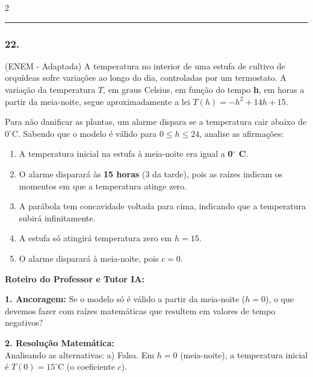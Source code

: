 \begin{multicols*}{2}
\par\vspace{\espacoQuestao}

\noindent\textcolor{CorLinha}{\rule{\linewidth}{0.5pt}} 
\par\vspace{\espacoPreQuestao}
\subsubsection*{22.} 
\begin{enunciadoLiteral}
(ENEM - Adaptada) A temperatura no interior de uma estufa de cultivo de orquídeas sofre variações ao longo do dia, controladas por um termostato. A variação da temperatura $T$, em graus Celsius, em função do tempo \textbf{h}, em horas a partir da meia-noite, segue aproximadamente a lei $T(h) = -h^2 + 14h + 15$.

Para não danificar as plantas, um alarme dispara se a temperatura cair abaixo de $0^\circ \text{C}$. Sabendo que o modelo é válido para $0 \le h \le 24$, analise as afirmações:

\begin{enumerate}[label=\alph*), itemsep=\espacoAlt]
    \item A temperatura inicial na estufa à meia-noite era igual a \textbf{0$^\circ$ C}.
    \item O alarme disparará às \textbf{15 horas} (3 da tarde), pois as raízes indicam os momentos em que a temperatura atinge zero.
    \item A parábola tem concavidade voltada para cima, indicando que a temperatura subirá infinitamente.
    \item A estufa só atingirá temperatura zero em $h = 15$.
    \item O alarme disparará à meia-noite, pois $c = 0$.
\end{enumerate}
\end{enunciadoLiteral}

\ifgabarito
    \begin{tcolorbox}[colback=CorTitUm!5, colframe=CorTitUm, boxrule=1pt, arc=4pt, left=6pt, right=6pt, top=6pt, bottom=6pt]
    \small\textbf{\textcolor{CorTitUm}{Roteiro do Professor e Tutor IA:}}\par\vspace{0.1cm}
    \color{CinzaEscuro}
    \textbf{1. Ancoragem:} Se o modelo só é válido a partir da meia-noite ($h=0$), o que devemos fazer com raízes matemáticas que resultem em valores de tempo negativos?\par\vspace{0.1cm}
    \textbf{2. Resolução Matemática:}\\
    Analisando as alternativas:
    a) Falsa. Em $h=0$ (meia-noite), a temperatura inicial é $T(0) = 15^\circ \text{C}$ (o coeficiente $c$).
    

\end{tcolorbox}
\end{multicols*}
